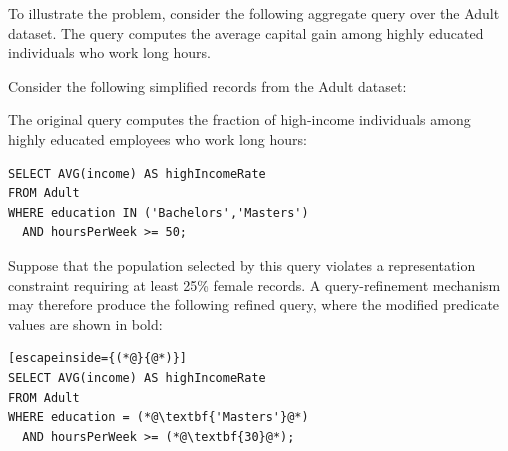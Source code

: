 To illustrate the problem, consider the following aggregate query over
the Adult dataset. The query computes the average capital gain among
highly educated individuals who work long hours.  
\begin{example}
Consider the following simplified records from the Adult dataset:

\begin{center}
\end{center}

The original query computes the fraction of high-income individuals
among highly educated employees who work long hours:

\begin{lstlisting}
SELECT AVG(income) AS highIncomeRate
FROM Adult
WHERE education IN ('Bachelors','Masters')
  AND hoursPerWeek >= 50;
\end{lstlisting}

Suppose that the population selected by this query violates a
representation constraint requiring at least 25\% female records.
A query-refinement mechanism may therefore produce the following
refined query, where the modified predicate values are shown in bold:

\begin{lstlisting}[escapeinside={(*@}{@*)}]
SELECT AVG(income) AS highIncomeRate
FROM Adult
WHERE education = (*@\textbf{'Masters'}@*)
  AND hoursPerWeek >= (*@\textbf{30}@*);
\end{lstlisting}


\end{example}
